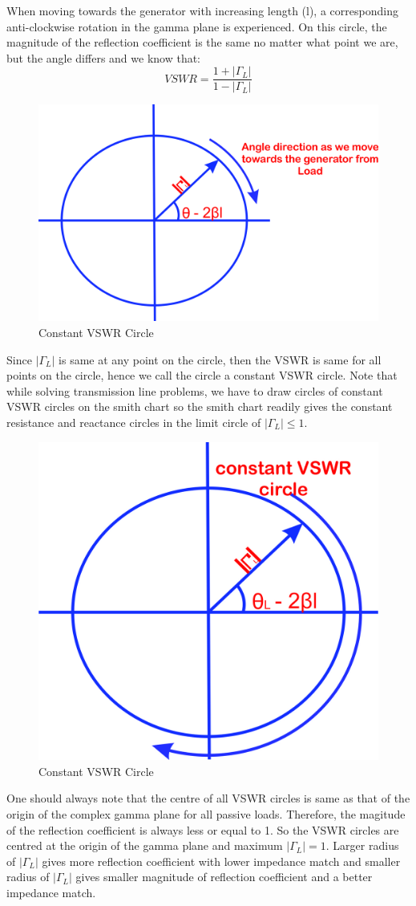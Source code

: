When moving towards the generator with increasing length (l), a corresponding anti-clockwise rotation in the gamma plane is experienced. On this circle, the magnitude of the reflection coefficient is the same no matter what point we are, but the angle differs and we know that:
\begin{equation}
VSWR = \frac{1 + |\Gamma_L|}{1 - |\Gamma_L|}
\end{equation}
\begin{figure}[h]
\centering
\includegraphics[width=0.7\linewidth]{./graphics/lkjhgryn}
\caption{Constant VSWR Circle}
\label{fig:lkjhgryn}
\end{figure}

Since $|\Gamma_L|$ is same at any point on the circle, then the VSWR is same for all points on the circle, hence we call the circle a constant VSWR circle. Note that while solving transmission line problems, we have to draw circles of constant VSWR circles on the smith chart so the smith chart readily gives the constant resistance and reactance circles in the limit circle of $|\Gamma_L|\leq 1$.
\begin{figure}[h]
\centering
\includegraphics[width=0.5\linewidth]{./graphics/qwertyhgf}
\caption{Constant VSWR Circle}
\label{fig:qwertyhgf}
\end{figure}

One should always note that the centre of all VSWR circles is same as that of the origin of  the complex gamma plane for all passive loads. Therefore, the magitude of the reflection coefficient is always less or equal to 1. So the VSWR circles are centred at the origin of the gamma plane and maximum $|\Gamma_L|=1$. Larger radius of $|\Gamma_L|$ gives more reflection coefficient with lower impedance match and smaller radius of  $|\Gamma_L|$ gives smaller magnitude of reflection coefficient and a better impedance match.

